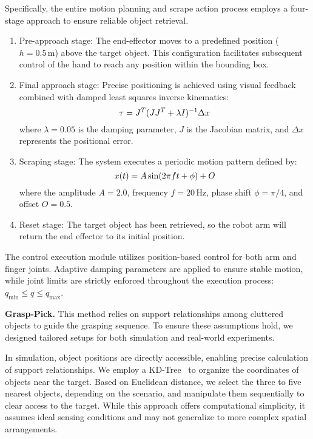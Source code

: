 Specifically, the entire motion planning and scrape action process employs a four-stage approach to ensure reliable object retrieval.
\begin{enumerate}
    \item {Pre-approach stage:} The end-effector moves to a predefined position ($h = 0.5\,\textrm{m}$) above the target object. This configuration facilitates subsequent control of the hand to reach any position within the bounding box.
    
    \item {Final approach stage:} Precise positioning is achieved using visual feedback combined with damped least squares inverse kinematics:
    \begin{equation}
        \tau = J^T (JJ^T + \lambda I)^{-1} \Delta x \notag
    \end{equation}
    where $\lambda = 0.05$ is the damping parameter, $J$ is the Jacobian matrix, and $\Delta x$ represents the positional error.
    
    \item {Scraping stage:} The system executes a periodic motion pattern defined by:
    \begin{equation}
        x(t) = A \sin(2\pi f t + \phi) + O \notag
    \end{equation}
    where the amplitude $A = 2.0$, frequency $f = 20\,\textrm{Hz}$, phase shift $\phi = \pi/4$, and offset $O = 0.5$.
    
    \item {Reset stage: } The target object has been retrieved, so the robot arm will return the end effector to its initial position.
\end{enumerate}
The control execution module utilizes position-based control for both arm and finger joints. Adaptive damping parameters are applied to ensure stable motion, while joint limits are strictly enforced throughout the execution process: $q_{\textrm{min}} \leq q \leq q_{\textrm{max}}$.

\noindent \textbf{Grasp-Pick.} This method relies on support relationships among cluttered objects to guide the grasping sequence. To ensure these assumptions hold, we designed tailored setups for both simulation and real-world experiments.

In simulation, object positions are directly accessible, enabling precise calculation of support relationships. We employ a KD-Tree~\cite{skrodzki2019kd} to organize the coordinates of objects near the target. Based on Euclidean distance, we select the three to five nearest objects, depending on the scenario, and manipulate them sequentially to clear access to the target. While this approach offers computational simplicity, it assumes ideal sensing conditions and may not generalize to more complex spatial arrangements.

